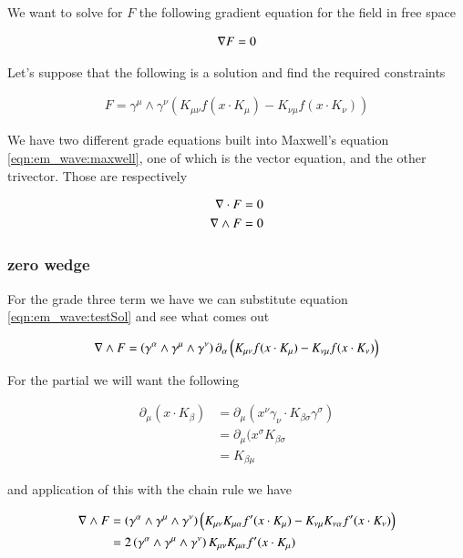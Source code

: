 We want to solve for $F$ the following gradient equation for the field in free space

\begin{align}\label{eqn:em_wave:maxwell}
\nabla F = 0
\end{align}

Let's suppose that the following is a solution and find the required constraints

\begin{align}\label{eqn:em_wave:testSol}
F = \gamma^\mu \wedge \gamma^\nu \left( K_{\mu\nu} f( x \cdot K_\mu ) -K_{\nu\mu} f( x \cdot K_\nu ) \right)
\end{align}

We have two different grade equations built into Maxwell's equation \ref{eqn:em_wave:maxwell}, one of which is the vector equation, and the other
trivector.  Those are respectively

\begin{align*}
\nabla \cdot F &= 0 \\
\nabla \wedge F &= 0
\end{align*}

\subsubsection{zero wedge }

For the grade three term we have we can substitute equation \ref{eqn:em_wave:testSol} and see what comes out

\begin{align*}
\nabla \wedge F 
&= 
\left( \gamma^\alpha \wedge \gamma^\mu \wedge \gamma^\nu\right)
\partial_\alpha \left( K_{\mu\nu} f( x \cdot K_\mu ) -K_{\nu\mu} f( x \cdot K_\nu ) \right) \\
\end{align*}

For the partial we will want the following

\begin{align*}
\partial_\mu ( x \cdot K_\beta ) 
&= \partial_\mu ( x^\nu \gamma_\nu \cdot K_{\beta\sigma} \gamma^\sigma ) \\
&= \partial_\mu ( x^\sigma K_{\beta\sigma} \\
&= K_{\beta\mu}
\end{align*}

and application of this with the chain rule we have

\begin{align*}
\nabla \wedge F 
&= 
\left( \gamma^\alpha \wedge \gamma^\mu \wedge \gamma^\nu\right)
\left( K_{\mu\nu} K_{\mu\alpha} f'( x \cdot K_\mu ) -K_{\nu\mu} K_{\nu\alpha} f'( x \cdot K_\nu ) \right) \\
&= 
2\left( \gamma^\alpha \wedge \gamma^\mu \wedge \gamma^\nu\right) K_{\mu\nu} K_{\mu\alpha} f'( x \cdot K_\mu ) 
\\
\end{align*}

